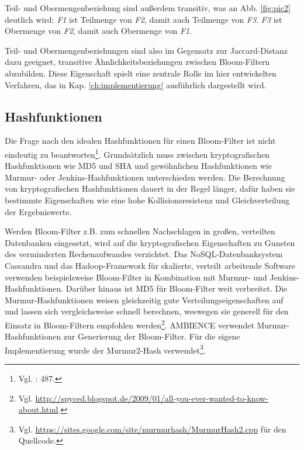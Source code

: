 \noindent
Teil- und Obermengenbeziehung sind außerdem transitiv, was an Abb. \ref{fig:pic2} deutlich wird: \textit{F1} ist Teilmenge von \textit{F2}, damit auch Teilmenge von \textit{F3}. \textit{F3} ist Obermenge von \textit{F2}, damit auch Obermenge von \textit{F1}. 

Teil- und Obermengenbeziehungen sind also im Gegensatz zur Jaccard-Distanz dazu geeignet, transitive Ähnlichkeitsbeziehungen zwischen Bloom-Filtern abzubilden. Diese Eigenschaft spielt eine zentrale Rolle im hier entwickelten Verfahren, das in Kap. \ref{ch:implementierung} ausführlich dargestellt wird. 
\subsection{Hashfunktionen}\label{sec:hashfunktionen}
Die Frage nach den idealen Hashfunktionen für einen Bloom-Filter ist nicht eindeutig zu beantworten\footnote{Vgl. \cite{Broder2004}: 487.}. Grundsätzlich muss zwischen kryptografischen Hashfunktionen wie MD5 und SHA und gewöhnlichen Hashfunktionen wie Murmur- oder Jenkins-Hashfunktionen unterschieden werden. Die Berechnung von kryptografischen Hashfunktionen dauert in der Regel länger, dafür haben sie bestimmte Eigenschaften wie eine hohe Kollisionsresistenz und Gleichverteilung der Ergebniswerte. 

Werden Bloom-Filter z.B. zum schnellen Nachschlagen in großen, verteilten Datenbanken eingesetzt, wird auf die kryptografischen Eigenschaften zu Gunsten des verminderten Rechenaufwandes verzichtet. Das NoSQL-Datenbanksystem Cassandra und das Hadoop-Framework für skalierte, verteilt arbeitende Software verwenden beispielsweise Bloom-Filter in Kombination mit Murmur- und Jenkins-Hashfunktionen. Darüber hinaus ist MD5 für Bloom-Filter weit verbreitet. Die Murmur-Hashfunktionen weisen gleichzeitig gute Verteilungseigenschaften auf und lassen sich vergleichsweise schnell berechnen, weswegen sie generell für den Einsatz in Bloom-Filtern empfohlen werden\footnote{Vgl. \url{http://spyced.blogspot.de/2009/01/all-you-ever-wanted-to-know-about.html}.}. AMBIENCE verwendet Murmur-Hashfunktionen zur Generierung der Bloom-Filter. Für die eigene Implementierung wurde der Murmur2-Hash verwendet\footnote{Vgl. \url{https://sites.google.com/site/murmurhash/MurmurHash2.cpp} für den Quellcode.}.  
